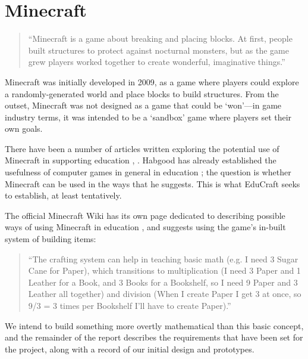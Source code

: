\section{Minecraft}
\begin{quote}
``Minecraft is a game about breaking and placing blocks. At first, people
built structures to protect against nocturnal monsters, but as the game grew
players worked together to create wonderful, imaginative things.''
\cite{website:minecraft}
\end{quote}

Minecraft was initially developed in 2009, as a game where players could
explore a randomly-generated world and place blocks to build structures. From
the outset, Minecraft was not designed as a game that could be `won'---in
game industry terms, it was intended to be a `sandbox' game where players set
their own goals.

There have been a number of articles written exploring the potential use of
Minecraft in supporting education \cite{brand13}, \cite{short12}. Habgood has
already established the usefulness of computer games in general in education
\cite{habgood07}; the question is whether Minecraft can be used in the ways
that he suggests. This is what EduCraft seeks to establish, at least tentatively.

The official Minecraft Wiki has its own page dedicated to describing possible ways
of using Minecraft in education \cite{website:mcwiki}, and suggests using the
game's in-built system of building items:
\begin{quote}
    ``The crafting system can help in teaching basic math (e.g. I need 3 Sugar
    Cane for Paper), which transitions to multiplication (I need 3 Paper and 1
    Leather for a Book, and 3 Books for a Bookshelf, so I need 9 Paper and 3 Leather
    all together) and division (When I create Paper I get 3 at once, so 9/3 =
    3 times per Bookshelf I'll have to create Paper).''
\end{quote}

We intend to build something more overtly mathematical than this basic concept,
and the remainder of the report describes the requirements that have been set
for the project, along with a record of our initial design and prototypes.
